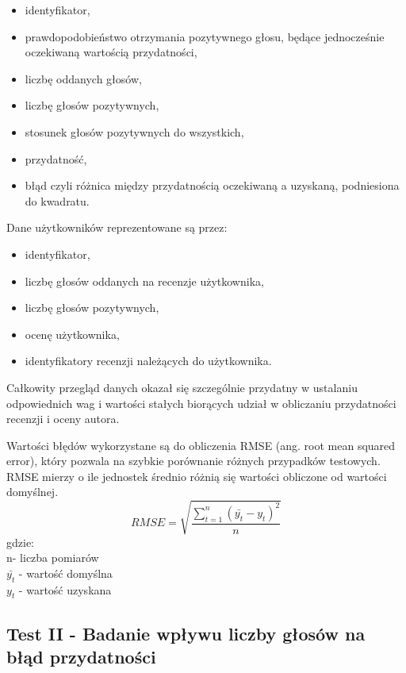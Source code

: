 \begin{itemize}
\item identyfikator,
\item prawdopodobieństwo otrzymania pozytywnego głosu, będące jednocześnie oczekiwaną wartością przydatności,
\item liczbę oddanych głosów,
\item liczbę głosów pozytywnych,
\item stosunek głosów pozytywnych do wszystkich,
\item przydatność,
\item błąd czyli różnica między przydatnością oczekiwaną a uzyskaną, podniesiona do kwadratu.
\end{itemize}

Dane użytkowników reprezentowane są przez:

\begin{itemize}
\item identyfikator,
\item liczbę głosów oddanych na recenzje użytkownika,
\item liczbę głosów pozytywnych,
\item ocenę użytkownika,
\item identyfikatory recenzji należących do użytkownika.
\end{itemize}

Całkowity przegląd danych okazał się szczególnie przydatny w ustalaniu odpowiednich wag i wartości stałych biorących udział w obliczaniu przydatności recenzji i oceny autora.

Wartości błędów wykorzystane są do obliczenia RMSE (ang. root mean squared error), który pozwala na szybkie porównanie różnych przypadków testowych. RMSE mierzy o ile jednostek średnio różnią się wartości obliczone od wartości domyślnej.\cite{rmseWiki}\\
\begin{equation}
RMSE=\sqrt{\frac{\sum_{t=1}^n (\bar{y_{t}}-y_{t})^2}{n}}
\end{equation}
gdzie:\\
n- liczba pomiarów\\
$\bar{y_{t}}$ - wartość domyślna\\
$y_{t}$ - wartość uzyskana\\

\subsection{Test II - Badanie wpływu liczby głosów na błąd przydatności}

